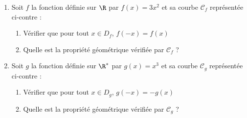 \begin{Activite}[][10 min]

\begin{minipage}[t]{0.65\linewidth}
\begin{enumerate}
    \item Soit $f$ la fonction définie sur $\R$ par $f(x) = 3x^2$ et sa courbe $\mathcal{C}_f$ représentée ci-contre :
        \begin{enumerate}
            \item Vérifier que pour tout $x \in D_f$, $f(-x) = f(x)$
            \item Quelle est la propriété géométrique vérifiée par $\mathcal{C}_f$ ? 
        \end{enumerate}
        \vspace{1cm}
    \item Soit $g$ la fonction définie sur $\R^*$ par $g(x) = x^3$ et sa courbe $\mathcal{C}_g$ représentée ci-contre :
        \begin{enumerate}
            \item Vérifier que pour tout $x \in D_g$, $g(-x) = -g(x)$
            \item Quelle est la propriété géométrique vérifiée par $\mathcal{C}_g$ ? 
        \end{enumerate}
\end{enumerate}        
\end{minipage}
\hfill
\begin{minipage}[t]{0.24\linewidth}
        \vspace{-0.5cm}

\end{minipage}
\end{Activite}
